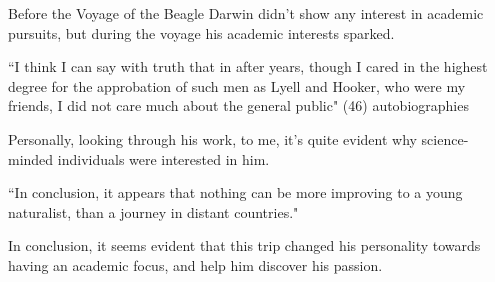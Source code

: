 \documentclass[11pt, oneside]{article}
\begin{document}

Before the Voyage of the Beagle Darwin didn't show any interest in academic pursuits, but during the voyage his academic interests sparked. 

``I think I can say with truth that in after years, though I cared in the highest degree for the approbation of such men as Lyell and Hooker, who were my friends, I did not care much about the general public" (46) autobiographies


Personally, looking through his work, to me, it's quite evident why science-minded individuals were interested in him.

``In conclusion, it appears that nothing can be more improving to a young naturalist, than a journey in distant countries."

\par In conclusion, it seems evident that this trip changed his personality towards having an academic focus, and help him discover his passion. 
\end{document}
